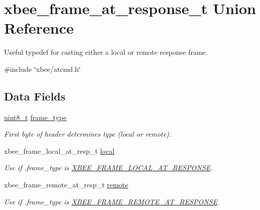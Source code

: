 \hypertarget{unionxbee__frame__at__response__t}{\section{xbee\-\_\-frame\-\_\-at\-\_\-response\-\_\-t Union Reference}
\label{unionxbee__frame__at__response__t}
}


Useful typedef for casting either a local or remote response frame.  




{\ttfamily \#include \char`\"{}xbee/atcmd.\-h\char`\"{}}

\subsection*{Data Fields}
\begin{DoxyCompactItemize}
\item 
\hypertarget{unionxbee__frame__at__response__t_afa34d393db5fa915716b483011415ddc}{\hyperlink{group__hal_gae1affc9ca37cfb624959c866a73f83c2}{uint8\-\_\-t} \hyperlink{unionxbee__frame__at__response__t_afa34d393db5fa915716b483011415ddc}{frame\-\_\-type}}\label{unionxbee__frame__at__response__t_afa34d393db5fa915716b483011415ddc}

\begin{DoxyCompactList}\small\item\em First byte of header determines type (local or remote). \end{DoxyCompactList}\item 
\hypertarget{unionxbee__frame__at__response__t_a380a2d41c59919bb281ca9c33787d583}{xbee\-\_\-frame\-\_\-local\-\_\-at\-\_\-resp\-\_\-t \hyperlink{unionxbee__frame__at__response__t_a380a2d41c59919bb281ca9c33787d583}{local}}\label{unionxbee__frame__at__response__t_a380a2d41c59919bb281ca9c33787d583}

\begin{DoxyCompactList}\small\item\em Use if .frame\-\_\-type is \hyperlink{group__xbee__device_gga7753bbebaf00d6d64942f64b6ae9b7b9ae66771334070219cd098c8201936cf4a}{X\-B\-E\-E\-\_\-\-F\-R\-A\-M\-E\-\_\-\-L\-O\-C\-A\-L\-\_\-\-A\-T\-\_\-\-R\-E\-S\-P\-O\-N\-S\-E}. \end{DoxyCompactList}\item 
\hypertarget{unionxbee__frame__at__response__t_a7366e5c04e76199eb50b874e50744d34}{xbee\-\_\-frame\-\_\-remote\-\_\-at\-\_\-resp\-\_\-t \hyperlink{unionxbee__frame__at__response__t_a7366e5c04e76199eb50b874e50744d34}{remote}}\label{unionxbee__frame__at__response__t_a7366e5c04e76199eb50b874e50744d34}

\begin{DoxyCompactList}\small\item\em Use if .frame\-\_\-type is \hyperlink{group__xbee__device_gga7753bbebaf00d6d64942f64b6ae9b7b9a3cd726459592fab4cdc9b5e6bbecb79f}{X\-B\-E\-E\-\_\-\-F\-R\-A\-M\-E\-\_\-\-R\-E\-M\-O\-T\-E\-\_\-\-A\-T\-\_\-\-R\-E\-S\-P\-O\-N\-S\-E}. \end{DoxyCompactList}\end{DoxyCompactItemize}


